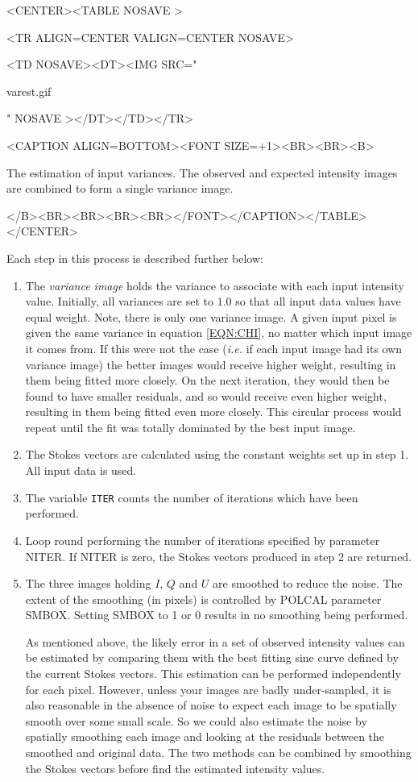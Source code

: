 \documentclass[twoside,11pt]{article}
\renewcommand{\_}{\texttt{\symbol{95}}}
\newcommand{\htmlfig}[3]{
   \label{#1}
   \begin{rawhtml} <CENTER><TABLE NOSAVE > \end{rawhtml}
   \begin{rawhtml} <TR ALIGN=CENTER VALIGN=CENTER NOSAVE> \end{rawhtml}
   \begin{rawhtml} <TD NOSAVE><DT><IMG SRC=" \end{rawhtml}
   #2
   \begin{rawhtml} " NOSAVE ></DT></TD></TR> \end{rawhtml}
   \begin{rawhtml} <CAPTION ALIGN=BOTTOM><FONT SIZE=+1><BR><BR><B> \end{rawhtml}
   #3 
   \begin{rawhtml} </B><BR><BR><BR><BR></FONT></CAPTION></TABLE></CENTER> \end{rawhtml}
}
\begin{document}
\begin{htmlonly}
\htmlfig{fig:varest}{varest.gif}{
The estimation of input variances. The observed and expected
intensity images are combined to form a single variance image.}
\end{htmlonly}

Each step in this process is described further below:

\begin{enumerate}

\item The \emph{variance image} holds the variance to associate with each
input intensity value. Initially, all variances are set to $1.0$ so that
all input data values have equal weight. Note, there is only one variance
image. A given input pixel is given the same variance in equation
\ref{EQN:CHI}, no matter which input image it comes from. If this were
not the case (\emph{i.e.} if each input image had its own variance image)
the better images would receive higher weight, resulting in them being
fitted more closely. On the next iteration, they would then be found to
have smaller residuals, and so would receive even higher weight,
resulting in them being fitted even more closely. This circular process
would repeat until the fit was totally dominated by the best input image. 

\item The Stokes vectors are calculated using the constant weights set up
in step 1. All input data is used.

\item The variable \verb+ITER+ counts the number of iterations which have
been performed. 

\item Loop round performing the number of iterations specified by
parameter NITER. If NITER is zero, the Stokes vectors produced in step
2 are returned.

\item The three images holding $I$, $Q$ and $U$ are smoothed to reduce
the noise. The extent of the smoothing (in pixels) is controlled by POLCAL 
parameter SMBOX. Setting SMBOX to 1 or 0 results in no smoothing
being performed. 

As mentioned above, the likely error in a set of observed intensity
values can be estimated by comparing them with the best fitting sine
curve defined by the current Stokes vectors. This estimation can be
performed independently for each pixel. However, unless your images are
badly under-sampled, it is also reasonable in the absence of noise to
expect each image to be spatially smooth over some small scale. So we
could also estimate the noise by spatially smoothing each image and
looking at the residuals between the smoothed and original data. The two
methods can be combined by smoothing the Stokes vectors before find the
estimated intensity values.


\end{enumerate}
\end{document}
